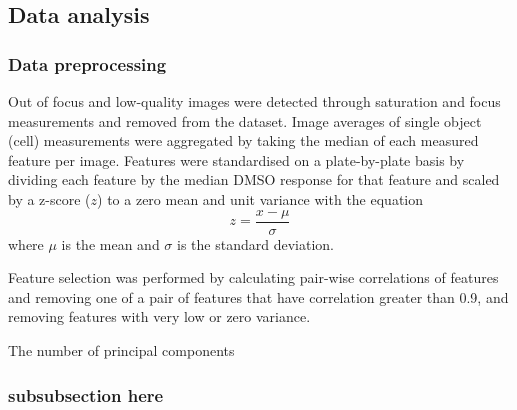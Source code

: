 \documentclass[a4paper,11pt,twoside,openright]{scrbook}
\begin{document}
\subsection{Data analysis}

\subsubsection{Data preprocessing}
Out of focus and low-quality images were detected through saturation and focus measurements and removed from the dataset.
Image averages of single object (cell) measurements were aggregated by taking the median of each measured feature per image.
Features were standardised on a plate-by-plate basis by dividing each feature by the median DMSO response for that feature and scaled by a z-score ($z$) to a zero mean and unit variance with the equation
\begin{equation} \label{eq:zscore}
    z = \frac{x - \mu}{\sigma}
\end{equation}
where $\mu$ is the mean and $\sigma$ is the standard deviation.

Feature selection was performed by calculating pair-wise correlations of features and removing one of a pair of features that have correlation greater than 0.9, and removing features with very low or zero variance.


The number of principal components

\subsubsection{subsubsection here}
\end{document}
